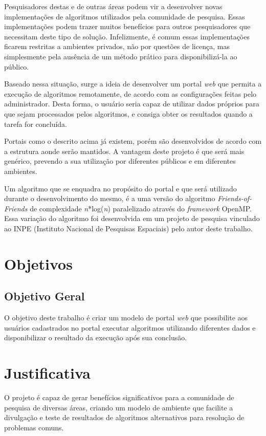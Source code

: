 \documentclass[tg]{mdtufsm}
\begin{document}
Pesquisadores destas e de outras áreas podem vir a desenvolver novas implementações de algoritmos utilizados pela comunidade de pesquisa. Essas implementações podem trazer muitos benefícios para outros pesquisadores que necessitam deste tipo de solução. Infelizmente, é comum essas implementações ficarem restritas a ambientes privados, não por questões de licença, mas simplesmente pela ausência de um método prático para disponibilizá-la ao público.

Baseado nessa situação, surge a ideia de desenvolver um portal \emph{web} que permita a execução de algoritmos remotamente, de acordo com as configurações feitas pelo administrador. Desta forma, o usuário seria capaz de utilizar dados próprios para que sejam processados pelos algoritmos, e consiga obter os resultados quando a tarefa for concluída.

Portais como o descrito acima já existem, porém são desenvolvidos de acordo com a estrutura aonde serão mantidos. A vantagem deste projeto é que será mais genérico, prevendo a sua utilização por diferentes públicos e em diferentes ambientes.

Um algoritmo que se enquadra no propósito do portal e que será utilizado durante o desenvolvimento do mesmo, é a uma versão do algoritmo \emph{Friends-of-Friends}\cite{friendsalg} de complexidade \emph{n}*log(\emph{n}) paralelizado através do \emph{framework} OpenMP. Essa variação do algoritmo foi desenvolvida em um projeto de pesquisa vinculado ao INPE (Instituto Nacional de Pesquisas Espaciais) pelo autor deste trabalho.

\section{Objetivos}

\subsection{Objetivo Geral}

O objetivo deste trabalho é criar um modelo de portal \emph{web} que possibilite aos usuários cadastrados no portal executar algoritmos utilizando diferentes dados e disponibilizar o resultado da execução após sua conclusão.

\section{Justificativa}

O projeto é capaz de gerar benefícios significativos para a comunidade de pesquisa de diversas áreas, criando um modelo de ambiente que facilite a divulgação e teste de resultados de algoritmos alternativos para resolução de problemas comuns.
\end{document}
